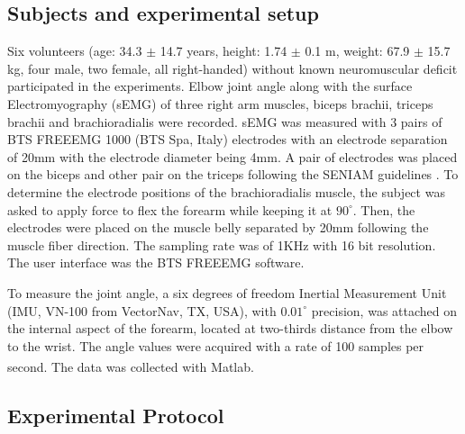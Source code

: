 \documentclass[letterpaper, 10 pt, conference]{ieeeconf}  %
\begin{document}
\subsection{Subjects and experimental setup}
Six volunteers (age: 34.3 $\pm$ 14.7 years, height: 1.74 $\pm$ 0.1 m, weight: 67.9 $\pm$ 15.7 kg, four male, two female, all right-handed) without known neuromuscular deficit participated in the experiments. Elbow joint angle along with the surface Electromyography (sEMG) of three right arm muscles, biceps brachii,  triceps brachii and brachioradialis were recorded. 
sEMG was measured with 3 pairs of BTS FREEEMG 1000 (BTS Spa, Italy) electrodes with an electrode separation of 20mm with the electrode diameter being 4mm. A pair of electrodes was placed on the biceps and other pair on the triceps following the SENIAM guidelines \cite{SENIAM20170110}. To determine the electrode positions of the brachioradialis muscle, the subject was asked to apply force to flex the forearm while keeping it at \(90^{\circ}\). Then, the electrodes were placed on the muscle belly separated by 20mm following the muscle fiber direction. The sampling rate was of 1KHz with 16 bit resolution. The user interface was the BTS FREEEMG software. 

To measure the joint angle, a six degrees of freedom Inertial Measurement Unit (IMU, VN-100 from VectorNav, TX, USA), with \(0.01^{\circ}\) precision, was attached on the internal aspect of the forearm, located at two-thirds distance from the elbow to the wrist. The angle values were acquired with a rate of 100 samples per second. The data was collected with Matlab\textsuperscript{\textregistered}.

\subsection{Experimental Protocol}
\end{document}
